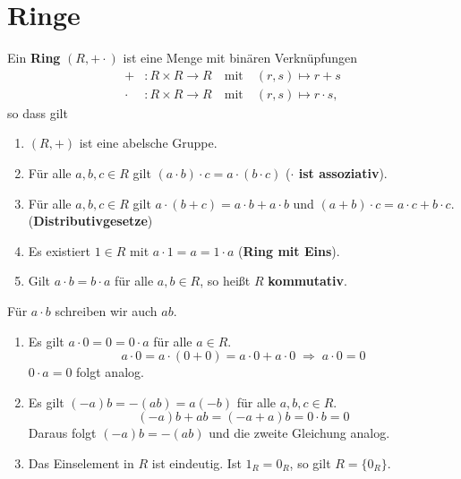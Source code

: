 \section{Ringe}
\begin{definition}
	Ein \textbf{Ring} $(R, + \cdot)$ ist eine Menge mit binären Verknüpfungen
	\begin{align*}
		+ &\colon R \times R \to R \quad\text{mit}\quad (r,s) \mapsto r+s\\
		\cdot &\colon R \times R \to R \quad\text{mit}\quad (r,s) \mapsto r\cdot s,
	\end{align*}
	so dass gilt
	\begin{enumerate}[label={\bfseries(R\arabic*)}]
		\item $(R,+)$ ist eine abelsche Gruppe.
		\item Für alle $a,b,c \in R$ gilt $(a \cdot b) \cdot c = a \cdot (b \cdot c)$ (\textbf{$\cdot$ ist assoziativ}).
		\item Für alle $a,b,c \in R$ gilt $a\cdot (b+c) = a\cdot b + a\cdot b$ und $(a+b)\cdot c = a\cdot c + b \cdot c$. (\textbf{Distributivgesetze})
		\item Es existiert $1 \in R$ mit $a \cdot 1 = a = 1 \cdot a$ (\textbf{Ring mit Eins}).
		\item Gilt $a \cdot b = b \cdot a$ für alle $a,b \in R$, so heißt $R$ \textbf{kommutativ}.
	\end{enumerate}
\end{definition}
Für $a \cdot b$ schreiben wir auch $ab$.
\begin{rem}\label{rem4_2}
	\begin{enumerate}[label=(\roman*)]
		\item Es gilt $a \cdot 0 = 0 = 0 \cdot a$ für alle $a \in R$.
		\[a \cdot 0 = a \cdot (0 + 0) = a \cdot 0 + a \cdot 0 \;\Rightarrow\; a \cdot 0 = 0\]
		$0 \cdot a = 0$ folgt analog.
		\item Es gilt $(-a)b = -(ab) = a(-b)$ für alle $a,b,c \in R$.
		\[(-a)b + ab = (-a + a) b = 0 \cdot b = 0\]
		Daraus folgt $(-a)b = -(ab)$ und die zweite Gleichung analog.
		\item Das Einselement in $R$ ist eindeutig. Ist $1_R = 0_R$, so gilt $R = \{0_R\}$.
	\end{enumerate}
\end{rem}

